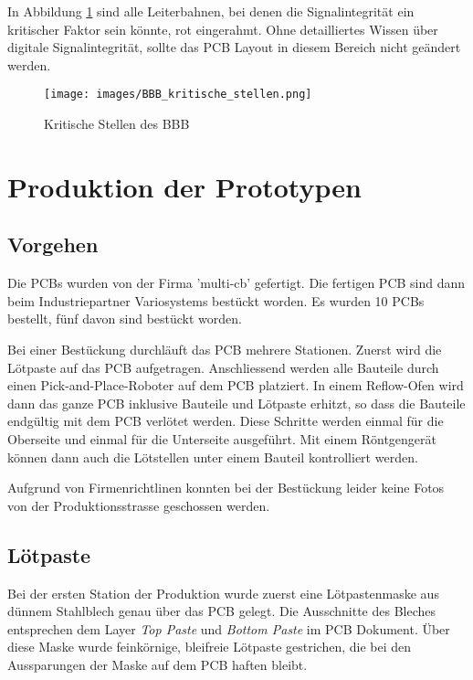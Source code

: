 In Abbildung \ref{kritischeStellenBBB} sind alle Leiterbahnen, bei denen die Signalintegrität ein kritischer Faktor sein könnte, rot eingerahmt. Ohne detailliertes Wissen über digitale Signalintegrität, sollte das PCB Layout in diesem Bereich nicht geändert werden.

\begin{figure}[!ht]
\centering
\texttt{[image: images/BBB\_kritische\_stellen.png]}
\caption{Kritische Stellen des BBB}
\label{kritischeStellenBBB}
\end{figure}




\section{Produktion der Prototypen}


\subsection{Vorgehen}
Die PCBs wurden von der Firma 'multi-cb' gefertigt. Die fertigen PCB sind dann beim Industriepartner Variosystems bestückt worden. Es wurden 10 PCBs bestellt, fünf davon sind bestückt worden.

Bei einer Bestückung durchläuft das PCB mehrere Stationen. Zuerst wird die Lötpaste auf das PCB aufgetragen. Anschliessend werden alle Bauteile durch einen Pick-and-Place-Roboter auf dem PCB platziert. In einem Reflow-Ofen wird dann das ganze PCB inklusive Bauteile und Lötpaste erhitzt, so dass die Bauteile endgültig mit dem PCB verlötet werden. Diese Schritte werden einmal für die Oberseite und einmal für die Unterseite ausgeführt. Mit einem Röntgengerät können dann auch die Lötstellen unter einem Bauteil kontrolliert werden.

Aufgrund von Firmenrichtlinen konnten bei der Bestückung leider keine Fotos von der Produktionsstrasse geschossen werden.


\subsection{Lötpaste}
Bei der ersten Station der Produktion wurde zuerst eine Lötpastenmaske aus dünnem Stahlblech genau über das PCB gelegt. Die Ausschnitte des Bleches entsprechen dem Layer \textit{Top Paste} und \textit{Bottom Paste} im PCB Dokument. Über diese Maske wurde feinkörnige, bleifreie Lötpaste gestrichen, die bei den Aussparungen der Maske auf dem PCB haften bleibt.

